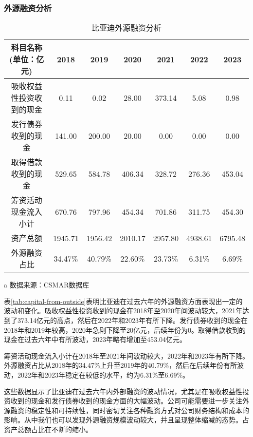 \subsubsection{外源融资分析}
\begin{table}
  \centering
  \begin{threeparttable}[c]
    \caption{比亚迪外源融资分析}
    \label{tab:capital-from-outside}
    \begin{tabular}{ccccccc}
      \toprule
        科目名称(单位：亿元) & 2018 & 2019 & 2020 & 2021 & 2022 & 2023 \\ 
      \midrule
        吸收权益性投资收到的现金 & 0.11  & 0.02  & 28.00  & 373.14  & 5.08  & 0.98  \\ 
        发行债券收到的现金 & 141.00  & 200.00  & 20.00  & 0.00  & 0.00  & 0.00  \\ 
        取得借款收到的现金 & 529.65  & 584.78  & 406.34  & 328.72  & 276.36  & 453.04  \\ 
        筹资活动现金流入小计 & 670.76  & 797.96  & 454.34  & 701.86  & 311.75  & 454.30  \\ 
        资产总额 & 1945.71  & 1956.42  & 2010.17  & 2957.80  & 4938.61  & 6795.48  \\ 
        外源融资占比 & 34.47\% & 40.79\% & 22.60\% & 23.73\% & 6.31\% & 6.69\% \\ 
      \bottomrule
    \end{tabular}
    \begin{tablenotes}
      \item [a] 数据来源：CSMAR数据库
    \end{tablenotes}
  \end{threeparttable}
\end{table}
表\eqref{tab:capital-from-outside}表明比亚迪在过去六年的外源融资方面表现出一定的波动和变化。吸收权益性投资收到的现金在2018年至2020年间波动较大，2021年达到了373.14亿元的高点，然后在2022年和2023年有所下降。发行债券收到的现金在2018年和2019年较高，2020年急剧下降至20亿元，后续年份为0。取得借款收到的现金在过去六年中有所波动，2023年略有增加至453.04亿元。

筹资活动现金流入小计在2018年至2021年间波动较大，2022年和2023年有所下降。外源融资占比从2018年的34.47\%上升至2019年的40.79\%，然后在后续年份有所波动，2022年和2023年稳定在较低的水平，约为6.31\%至6.69\%。

这些数据显示了比亚迪在过去六年内外部融资的波动情况，尤其是在吸收权益性投资收到的现金和发行债券收到的现金方面的大幅波动。公司可能需要进一步关注外源融资的稳定性和可持续性，同时密切关注各种融资方式对公司财务结构和成本的影响。从中我们也可以发现外源融资规模波动较大，并且呈现整体缩减的态势。占资产总额占比在不断的缩小。

